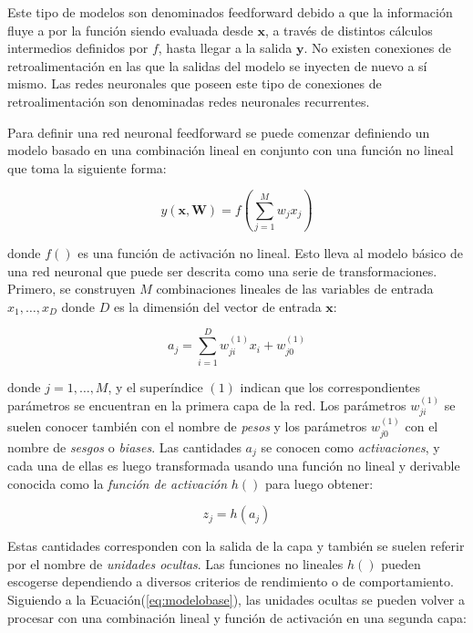         Este tipo de modelos son denominados feedforward debido a que la información fluye a por la función siendo evaluada 
        desde $\mathbf{x}$, a través de distintos cálculos intermedios definidos por $f$, hasta llegar a la salida $\mathbf{y}$.
        No existen conexiones de retroalimentación en las que la salidas del modelo se inyecten de nuevo a sí mismo. Las redes 
        neuronales que poseen este tipo de conexiones de retroalimentación son denominadas redes neuronales recurrentes.

        Para definir una red neuronal feedforward se puede comenzar definiendo un modelo basado en una combinación 
        lineal en conjunto con una función no lineal que toma la siguiente forma:

        \begin{equation}\label{eq:modelobase}
            y(\mathbf{x}, \textbf{W}) = f\left(\sum_{j=1}^M w_j  x_j\right)
        \end{equation}

        donde $f()$ es una función de activación no lineal. Esto lleva al modelo básico de una red neuronal que puede ser 
        descrita como una serie de transformaciones. Primero, se construyen $M$ combinaciones lineales de las variables 
        de entrada $x_1, \ldots , x_D$ donde $D$ es la dimensión del vector de entrada $\mathbf{x}$:
        
        \begin{equation}
            a_j = \sum_{i=1}^D w_{ji}^{(1)} x_i + w_{j0}^{(1)}
        \end{equation}

        donde $j = 1, \ldots , M$, y el superíndice $(1)$ indican que los correspondientes parámetros se encuentran en la 
        primera capa de la red. Los parámetros $w_{ji}^{(1)}$ se suelen conocer también con el nombre de \textit{pesos} y 
        los parámetros $ w_{j0}^{(1)}$ con el nombre de \textit{sesgos} o \textit{biases}. Las cantidades $a_j$ se conocen 
        como \textit{activaciones}, y cada una de ellas es luego transformada usando una función no lineal y derivable conocida 
        como la \textit{función de activación} $h()$ para luego obtener:

        \begin{equation}
            z_j = h(a_j)
        \end{equation}

        Estas cantidades corresponden con la salida de la capa y también se suelen referir por el nombre de  \textit{unidades ocultas}.
        Las funciones no lineales $h()$ pueden escogerse dependiendo a diversos criterios de rendimiento o de comportamiento. Siguiendo
        a la Ecuación(\ref{eq:modelobase}), las unidades ocultas se pueden volver a procesar con una combinación lineal y función 
        de activación en una segunda capa:

